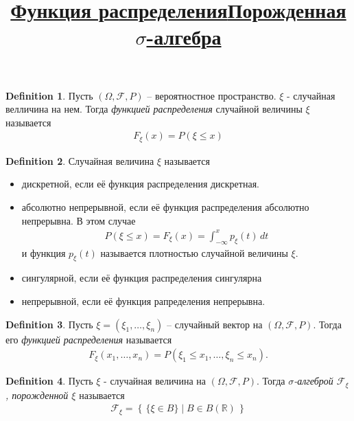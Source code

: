 \documentclass[a4paper]{article}
\theoremstyle{plain}
\theoremstyle{remark}
\theoremstyle{definition}
\newtheorem{definition}{Definition}
\newcommand{\setR}{\mathbb{R}}
\newcommand{\setF}{\mathcal{F}}
\newcommand{\braces}[1]{\left\{ #1 \right\}} %
\newcommand{\condset}[2]{\braces{\, #1 \mid #2 \,}} %
\renewcommand{\leq}{\leqslant}
\newcommand{\bigtitle}[1]{\title{\textbf{\underline{#1}}}}
\begin{document}
\bigtitle{Функция распределения}

\begin{definition}
  Пусть $(\Omega, \setF, P)$ -- вероятностное пространство.
  $\xi$ - случайная велличина на нем. Тогда \emph{функцией распределения} случайной величины $\xi$ называется
    \begin{align*}
      F_\xi (x) = P(\xi \leq x)
    \end{align*}
\end{definition}

\begin{definition}
  Случайная величина $\xi$ называется
  \begin{itemize}
    \item 
      дискретной, если её функция распределения дискретная.

    \item 
      абсолютно непрерывной, если её функция распределения абсолютно непрерывна. 
      В этом случае
      \begin{align*}
        P(\xi \leq x) = F_\xi (x) = \int_{-\infty}^{x} p_\xi (t)\, dt
      \end{align*}
      и функция $p_\xi (t)$ называется плотностью случайной величины $\xi$.\\

    \item
      сингулярной, если её функция распределения сингулярна

    \item
      непрерывной, если её функция рапределения непрерывна.
  \end{itemize}
\end{definition}

\begin{definition}
  Пусть $\xi = (\xi_1, \ldots, \xi_n)$ -- случайный вектор на $(\Omega, \setF, P)$. 
  Тогда его \emph{функцией распределения} называется 
  \begin{align*}
    F_\xi (x_1, \ldots, x_n) = P(\xi_1 \leq x_1, \ldots, \xi_n \leq x_n).
  \end{align*}
\end{definition}
\bigtitle{Порожденная $\sigma$-алгебра}

\begin{definition}
  Пусть $\xi$ - случайная величина на $(\Omega, \setF, P)$. 
  Тогда \emph{$\sigma$-алгеброй $\setF_\xi$, порожденной $\xi$} называется
  \begin{align*}
    \setF_\xi = \condset{\{ \xi \in B \}}{B \in B(\setR)}
  \end{align*}
\end{definition}
\end{document}
